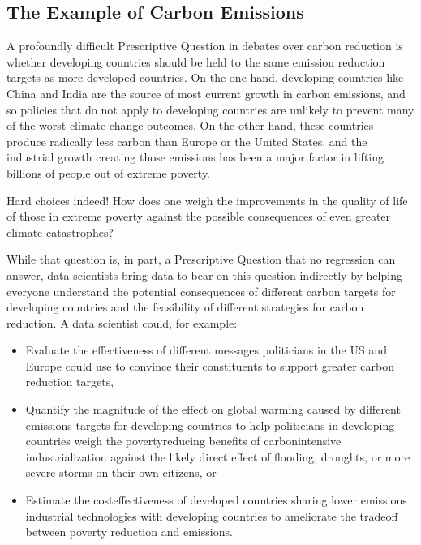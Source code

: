 \documentclass[letterpaper,10pt,english]{jupyterBook}
\begin{document}
\subsection{The Example of Carbon Emissions}
\label{\detokenize{30_questions/06_descriptive_prescriptive_examples:the-example-of-carbon-emissions}}
\sphinxAtStartPar
A profoundly difficult Prescriptive Question in debates over carbon reduction is whether developing countries should be held to the same emission reduction targets as more developed countries. On the one hand, developing countries like China and India are the source of most current growth in carbon emissions, and so policies that do not apply to developing countries are unlikely to prevent many of the worst climate change outcomes. On the other hand, these countries produce radically less carbon  than Europe or the United States, and the industrial growth creating those emissions has been a major factor in lifting billions of people out of extreme poverty.

\sphinxAtStartPar
Hard choices indeed! How does one weigh the improvements in the quality of life of those in extreme poverty against the possible consequences of even greater climate catastrophes?

\sphinxAtStartPar
While that question is, in part, a Prescriptive Question that no regression can answer, data scientists  bring data to bear on this question indirectly by helping everyone understand the potential consequences of different carbon targets for developing countries and the feasibility of different strategies for carbon reduction. A data scientist could, for example:
\begin{itemize}
\item {} 
\sphinxAtStartPar
Evaluate the effectiveness of different messages politicians in the US and Europe could use to convince their constituents to support greater carbon reduction targets,

\item {} 
\sphinxAtStartPar
Quantify the magnitude of the effect on global warming caused by different emissions targets for developing countries to help politicians in developing countries weigh the poverty\sphinxhyphen{}reducing benefits of carbon\sphinxhyphen{}intensive industrialization against the likely direct effect of flooding, droughts, or more severe storms on their own citizens, or

\item {} 
\sphinxAtStartPar
Estimate the cost\sphinxhyphen{}effectiveness of developed countries sharing lower emissions industrial technologies with developing countries to ameliorate the tradeoff between poverty reduction and emissions.

\end{itemize}
\end{document}

